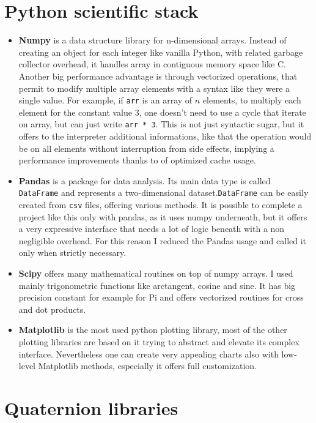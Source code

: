 \section{Python scientific stack}
\begin{itemize}
	\item \textbf{Numpy} is a data structure library for n-dimensional arrays. Instead of creating an object for each integer like vanilla Python, with related garbage collector overhead, it handles array in contiguous memory space like C. Another big performance advantage is through vectorized operations, that permit to modify multiple array elements with a syntax like they were a single value. For example, if \texttt{arr} is an array of $n$ elements, to multiply each element for the constant value 3, one doesn't need to use a cycle that iterate on array, but can just write \texttt{arr * 3}. This is not just syntactic sugar, but it offers to the interpreter additional informations, like that the operation would be on all elements without interruption from side effects, implying a performance improvements thanks to of optimized cache usage.
	\item \textbf{Pandas} is a package for data analysis. Its main data type is called \texttt{DataFrame} and represents a two-dimensional dataset.\texttt{DataFrame} can be easily created from \texttt{csv} files, offering various methods. It is possible to complete a project like this only with pandas, as it uses numpy underneath, but it offers a very expressive interface that needs a lot of logic beneath with a non negligible overhead. For this reason I reduced the Pandas usage and called it only when strictly necessary.
	\item \textbf{Scipy} offers many mathematical routines on top of numpy arrays. I used mainly trigonometric functions like arctangent, cosine and sine. It has big precision constant for example for Pi and offers vectorized routines for cross and dot products.
	\item \textbf{Matplotlib} is the most used python plotting library, most of the other plotting libraries are based on it trying to abstract and elevate its complex interface. Nevertheless one can create very appealing charts also with low-level Matplotlib methods, especially it offers full customization.
\end{itemize}

\section{Quaternion libraries}


